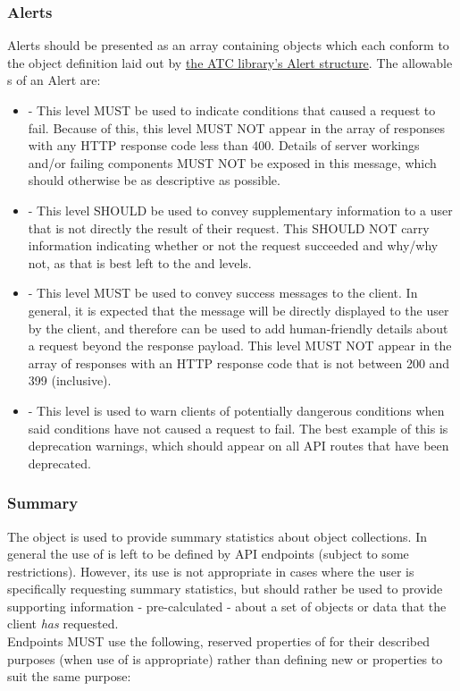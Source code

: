 \subsubsection{Alerts}
Alerts should be presented as an array containing objects which each conform to the object definition laid out by
\href{https://godoc.org/github.com/apache/trafficcontrol/lib/go-tc#Alert}{the ATC library's Alert structure}. The allowable s of an Alert are:

\begin{itemize}
	\item {} - This level MUST be used to indicate conditions that caused a request to fail. Because of this, this level MUST NOT appear
	in the  array of responses with any HTTP response code less than 400. Details of server workings and/or failing
	components MUST NOT be exposed in this message, which should otherwise be as descriptive as possible.
	\item {} - This level SHOULD be used to convey supplementary information to a user that is not directly the result of their request.
	This SHOULD NOT carry information indicating whether or not the request succeeded and why/why not, as that is best left to the 
	and  levels.
	\item {} - This level MUST be used to convey success messages to the client. In general, it is expected that the message will be
	directly displayed to the user by the client, and therefore can be used to add human-friendly details about a request beyond the response
	payload. This level MUST NOT appear in the  array of responses with an HTTP response code that is not between 200 and 399
	(inclusive).
	\item {} - This level is used to warn clients of potentially dangerous conditions when said conditions have not caused a request
	to fail. The best example of this is deprecation warnings, which should appear on all API routes that have been deprecated.
\end{itemize}

\subsubsection{Summary}
The  object is used to provide summary statistics about object
collections. In general the use of  is left to be defined by API
endpoints (subject to some restrictions). However, its use is not appropriate in
cases where the user is specifically requesting summary statistics, but should
rather be used to provide supporting information - pre-calculated - about a set
of objects or data that the client \emph{has} requested.\\
Endpoints MUST use the following, reserved properties of  for
their described purposes (when use of  is appropriate) rather than
defining new  or  properties to suit the same
purpose:

